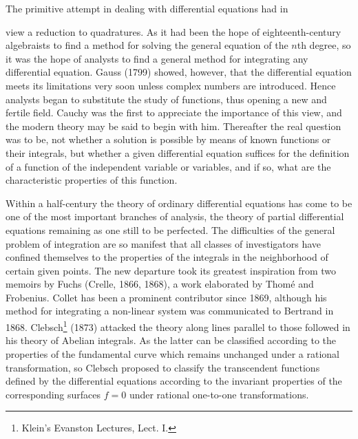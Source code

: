 \documentclass[oneside]{book}
\begin{document}
{The primitive attempt in dealing with differential equations had in


view a reduction to quadratures. As it had been the hope of
eighteenth-century algebraists to find a method for solving the
general equation of the $n$th degree, so it was the hope of analysts
to find a general method for integrating any differential
equation. Gauss (1799) showed, however, that the differential
equation meets its limitations very soon unless complex numbers are
introduced. Hence analysts began to substitute the study of
functions, thus opening a new and fertile field. Cauchy was the
first to appreciate the importance of this view, and the modern
theory may be said to begin with him. Thereafter the real question
was to be, not whether a solution is possible by means of known
functions or their integrals, but whether a given differential
equation suffices for the definition of a function of the
independent variable or variables, and if so, what are the
characteristic properties of this function.

Within a half-century the theory of ordinary differential equations
has come to be one of the most important branches of analysis, the
theory of partial differential equations remaining as one still to
be perfected. The difficulties of the general problem of integration
are so manifest that all classes of investigators have confined
themselves to the properties of the integrals in the neighborhood of
certain given points. The new departure took its greatest
inspiration from two memoirs by Fuchs (Crelle, 1866, 1868), a work
elaborated by Thom\'e and Frobenius. Collet has been a prominent
contributor since 1869, although his method for integrating a
non-linear system was communicated to Bertrand in 1868.
Clebsch\footnote{Klein's Evanston Lectures, Lect. I.} (1873) attacked
the theory along lines parallel to those followed in his theory of
Abelian integrals. As the latter can be classified according to the
properties of the fundamental curve which remains unchanged under a
rational transformation, so Clebsch proposed to classify the
transcendent functions defined by the differential equations
according to the invariant properties of the corresponding surfaces
$f = 0$ under rational one-to-one transformations.

}
\end{document}
